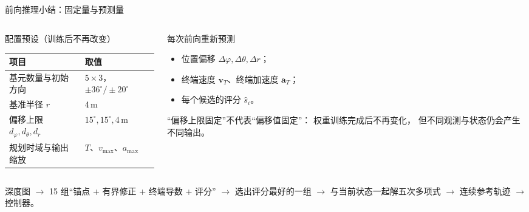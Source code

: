 \begin{frame}{前向推理小结：固定量与预测量}
  \small
  \begin{columns}[t]
    \begin{column}{0.5\textwidth}
      \begin{block}{配置预设（训练后不再改变）}
        \footnotesize
        \begin{tabular}{@{}ll@{}}
          \toprule
          项目 & 取值 \\
          \midrule
          基元数量与初始方向 & $5\times3$，$\pm36^\circ/\pm20^\circ$ \\
          基准半径 $r$ & 4\,m \\
          偏移上限 $d_\varphi,d_\theta,d_r$ & $15^\circ,15^\circ,4$\,m \\
          规划时域与输出缩放 & $T$、$v_{\max}$、$a_{\max}$ \\
          \bottomrule
        \end{tabular}
      \end{block}
    \end{column}
    \begin{column}{0.46\textwidth}
      \begin{block}{每次前向重新预测}
        \footnotesize
        \begin{itemize}\tight
          \item 位置偏移 $\Delta\varphi,\Delta\theta,\Delta r$；
          \item 终端速度 $\mathbf v_T$、终端加速度 $\mathbf a_T$；
          \item 每个候选的评分 $\hat s_i$。
        \end{itemize}
      \end{block}
      \begin{reading}
        \scriptsize
        “偏移上限固定”不代表“偏移值固定”：
        权重训练完成后不再变化，
        但不同观测与状态仍会产生不同输出。
      \end{reading}
    \end{column}
  \end{columns}

  \vspace{0.2em}
  \begin{teach}[流程小结]
    \small
    深度图 $\to$ 15 组“锚点 + 有界修正 + 终端导数 + 评分”
    $\to$ 选出评分最好的一组 $\to$ 与当前状态一起解五次多项式
    $\to$ 连续参考轨迹 $\to$ 控制器。
  \end{teach}
\end{frame}

